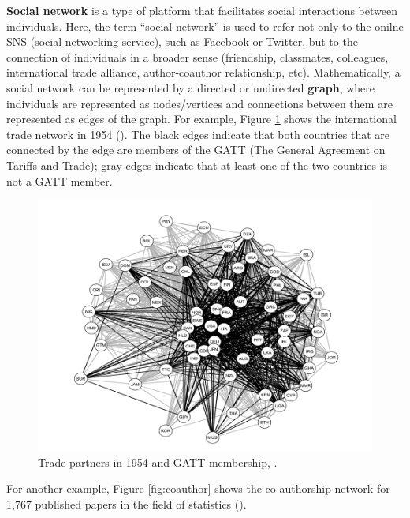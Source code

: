 \documentclass[10.5pt, A4paper, openany, uplatex]{book}
\numberwithin{equation}{section}
\begin{document}
\textbf{Social network} is a type of platform that facilitates social interactions between individuals.
Here, the term ``social network'' is used to refer not only to the onilne SNS (social networking service), such as Facebook or Twitter, but to the connection of individuals in a broader sense (friendship, classmates, colleagues, international trade alliance, author-coauthor relationship, etc).
Mathematically, a social network can be represented by a directed or undirected \textbf{graph}, where individuals are represented as nodes/vertices and connections between them are represented as edges of the graph.
For example, Figure \ref{fig:GATT} shows the international trade network in 1954 (\cite{arpino2017implementing}).
The black edges indicate that both countries that are connected by the edge are members of the GATT (The General Agreement on Tariffs and Trade); gray edges indicate that at least one of the two countries is not a GATT member. 

\begin{figure}[h!]
	\begin{center}
		\includegraphics[width = 12cm]{GATT.png}
		\caption{Trade partners in 1954 and GATT membership, \cite{arpino2017implementing}.}
		\label{fig:GATT}
	\end{center}
\end{figure}

For another example, Figure \ref{fig:coauthor} shows the co-authorship network for 1,767 published papers in the field of statistics (\cite{said2010author}).
\end{document}
